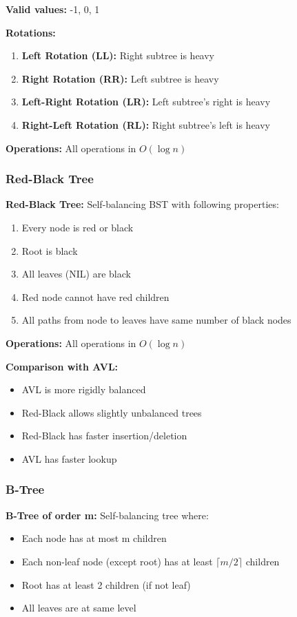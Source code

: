 \documentclass[11pt,a4paper]{article}
\begin{document}
\textbf{Valid values:} -1, 0, 1

\textbf{Rotations:}
\begin{enumerate}
    \item \textbf{Left Rotation (LL):} Right subtree is heavy
    \item \textbf{Right Rotation (RR):} Left subtree is heavy
    \item \textbf{Left-Right Rotation (LR):} Left subtree's right is heavy
    \item \textbf{Right-Left Rotation (RL):} Right subtree's left is heavy
\end{enumerate}

\textbf{Operations:} All operations in $O(\log n)$

\subsubsection{Red-Black Tree}

\begin{defbox}
\textbf{Red-Black Tree:} Self-balancing BST with following properties:
\begin{enumerate}
    \item Every node is red or black
    \item Root is black
    \item All leaves (NIL) are black
    \item Red node cannot have red children
    \item All paths from node to leaves have same number of black nodes
\end{enumerate}
\end{defbox}

\textbf{Operations:} All operations in $O(\log n)$

\textbf{Comparison with AVL:}
\begin{itemize}
    \item AVL is more rigidly balanced
    \item Red-Black allows slightly unbalanced trees
    \item Red-Black has faster insertion/deletion
    \item AVL has faster lookup
\end{itemize}

\subsubsection{B-Tree}

\begin{defbox}
\textbf{B-Tree of order m:} Self-balancing tree where:
\begin{itemize}
    \item Each node has at most m children
    \item Each non-leaf node (except root) has at least $\lceil m/2 \rceil$ children
    \item Root has at least 2 children (if not leaf)
    \item All leaves are at same level
\end{itemize}
\end{defbox}
\end{document}
